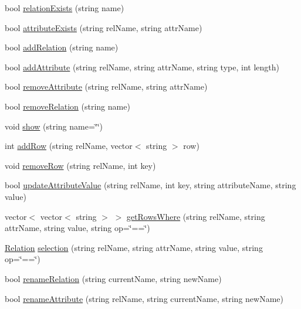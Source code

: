 \begin{DoxyCompactItemize}
\item 
bool \hyperlink{class_database_ac1435d217402f4667dd3c62e2c3456d1}{relation\-Exists} (string name)
\item 
bool \hyperlink{class_database_a8553be991d9615cd04aa96f117363537}{attribute\-Exists} (string rel\-Name, string attr\-Name)
\item 
bool \hyperlink{class_database_ae1a928caf223e2cbe1a3a78140773e88}{add\-Relation} (string name)
\item 
bool \hyperlink{class_database_ab53f2a8af55fd5ff8daa92eaf4f2c55f}{add\-Attribute} (string rel\-Name, string attr\-Name, string type, int length)
\item 
bool \hyperlink{class_database_af7bed4fd63c5374cb1fd97f0e9f72b96}{remove\-Attribute} (string rel\-Name, string attr\-Name)
\item 
bool \hyperlink{class_database_abc38a65c8593339c450f918ebe5d48c1}{remove\-Relation} (string name)
\item 
void \hyperlink{class_database_a959909a78516b1a6a73ccea7968c70e7}{show} (string name=\char`\"{}\char`\"{})
\item 
int \hyperlink{class_database_ac73ed9280bd5c4f685cdd89ef7e2cd3e}{add\-Row} (string rel\-Name, vector$<$ string $>$ row)
\item 
void \hyperlink{class_database_aa8324ade169386cde3f1c0a212e186f9}{remove\-Row} (string rel\-Name, int key)
\item 
bool \hyperlink{class_database_a61173497b8a9b6f1701fabfaa920954c}{update\-Attribute\-Value} (string rel\-Name, int key, string attribute\-Name, string value)
\item 
vector$<$ vector$<$ string $>$ $>$ \hyperlink{class_database_ad131657b77495a4c0c5c23439bd1c3dc}{get\-Rows\-Where} (string rel\-Name, string attr\-Name, string value, string op=\char`\"{}==\char`\"{})
\item 
\hyperlink{class_relation}{Relation} \hyperlink{class_database_a29c9274854dd136ff1c42568c0352876}{selection} (string rel\-Name, string attr\-Name, string value, string op=\char`\"{}==\char`\"{})
\item 
bool \hyperlink{class_database_af9213d1ecf9a4ec08d67e3f2bd565f2f}{rename\-Relation} (string current\-Name, string new\-Name)
\item 
bool \hyperlink{class_database_a1f9663265995e751bf461d1b9e60ebfd}{rename\-Attribute} (string rel\-Name, string current\-Name, string new\-Name)
\item 

\end{DoxyCompactItemize}
